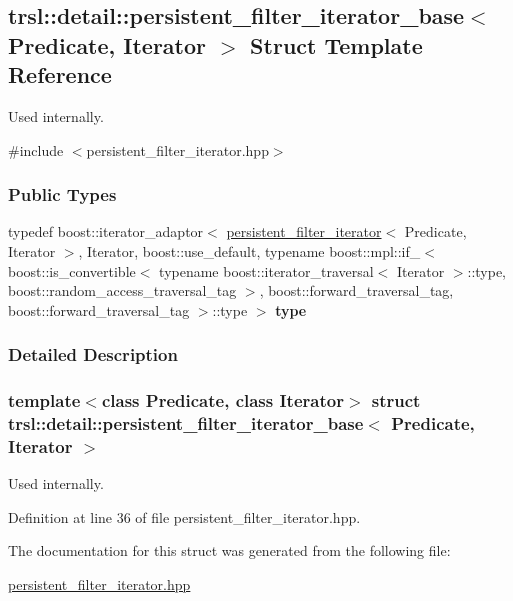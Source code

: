 \hypertarget{structtrsl_1_1detail_1_1persistent__filter__iterator__base}{
\subsection{trsl::detail::persistent\_\-filter\_\-iterator\_\-base$<$ Predicate, Iterator $>$ Struct Template Reference}
\label{structtrsl_1_1detail_1_1persistent__filter__iterator__base}
}


Used internally.  


{\ttfamily \#include $<$persistent\_\-filter\_\-iterator.hpp$>$}\subsubsection*{Public Types}
\begin{DoxyCompactItemize}
\item 
\hypertarget{structtrsl_1_1detail_1_1persistent__filter__iterator__base_ab48b68cea74fd1ab02d3b995802d3bc5}{
typedef boost::iterator\_\-adaptor$<$ \hyperlink{classtrsl_1_1persistent__filter__iterator}{persistent\_\-filter\_\-iterator}$<$ Predicate, Iterator $>$, Iterator, boost::use\_\-default, typename boost::mpl::if\_\-$<$ boost::is\_\-convertible$<$ typename boost::iterator\_\-traversal$<$ Iterator $>$::type, boost::random\_\-access\_\-traversal\_\-tag $>$, boost::forward\_\-traversal\_\-tag, boost::forward\_\-traversal\_\-tag $>$::type $>$ {\bfseries type}}
\label{structtrsl_1_1detail_1_1persistent__filter__iterator__base_ab48b68cea74fd1ab02d3b995802d3bc5}

\end{DoxyCompactItemize}


\subsubsection{Detailed Description}
\subsubsection*{template$<$class Predicate, class Iterator$>$ struct trsl::detail::persistent\_\-filter\_\-iterator\_\-base$<$ Predicate, Iterator $>$}

Used internally. 

Definition at line 36 of file persistent\_\-filter\_\-iterator.hpp.

The documentation for this struct was generated from the following file:\begin{DoxyCompactItemize}
\item 
\hyperlink{persistent__filter__iterator_8hpp}{persistent\_\-filter\_\-iterator.hpp}\end{DoxyCompactItemize}
